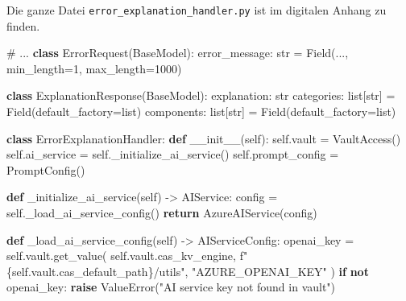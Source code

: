 \documentclass[
  a4paper,
  12pt,
  oneside,
  open=any,
  BCOR=12mm,
  DIV=14,
  parskip=half*,
  headsepline,
  footsepline,
  pointlessnumbers,
  liststotoc,
  numbers=noenddot,
  listof=totoc]{scrartcl}
\newenvironment{Shaded}{\begin{snugshade}}{\end{snugshade}}
\newcommand{\BuiltInTok}[1]{\textcolor[rgb]{0.00,0.23,0.31}{#1}}
\newcommand{\CommentTok}[1]{\textcolor[rgb]{0.37,0.37,0.37}{#1}}
\newcommand{\ControlFlowTok}[1]{\textcolor[rgb]{0.00,0.23,0.31}{\textbf{#1}}}
\newcommand{\DecValTok}[1]{\textcolor[rgb]{0.68,0.00,0.00}{#1}}
\newcommand{\FunctionTok}[1]{\textcolor[rgb]{0.28,0.35,0.67}{#1}}
\newcommand{\KeywordTok}[1]{\textcolor[rgb]{0.00,0.23,0.31}{\textbf{#1}}}
\newcommand{\NormalTok}[1]{\textcolor[rgb]{0.00,0.23,0.31}{#1}}
\newcommand{\OperatorTok}[1]{\textcolor[rgb]{0.37,0.37,0.37}{#1}}
\newcommand{\PreprocessorTok}[1]{\textcolor[rgb]{0.68,0.00,0.00}{#1}}
\newcommand{\SpecialCharTok}[1]{\textcolor[rgb]{0.37,0.37,0.37}{#1}}
\newcommand{\SpecialStringTok}[1]{\textcolor[rgb]{0.13,0.47,0.30}{#1}}
\newcommand{\StringTok}[1]{\textcolor[rgb]{0.13,0.47,0.30}{#1}}
\newcommand{\VariableTok}[1]{\textcolor[rgb]{0.07,0.07,0.07}{#1}}
\begin{document}
Die ganze Datei \texttt{error\_explanation\_handler.py} ist im digitalen
Anhang zu finden.

\begin{Shaded}
\begin{Highlighting}[]
\CommentTok{\# ...}
\KeywordTok{class}\NormalTok{ ErrorRequest(BaseModel):}
\NormalTok{    error\_message: }\BuiltInTok{str} \OperatorTok{=}\NormalTok{ Field(..., min\_length}\OperatorTok{=}\DecValTok{1}\NormalTok{, max\_length}\OperatorTok{=}\DecValTok{1000}\NormalTok{)}

\KeywordTok{class}\NormalTok{ ExplanationResponse(BaseModel):}
\NormalTok{    explanation: }\BuiltInTok{str}
\NormalTok{    categories: }\BuiltInTok{list}\NormalTok{[}\BuiltInTok{str}\NormalTok{] }\OperatorTok{=}\NormalTok{ Field(default\_factory}\OperatorTok{=}\BuiltInTok{list}\NormalTok{)}
\NormalTok{    components: }\BuiltInTok{list}\NormalTok{[}\BuiltInTok{str}\NormalTok{] }\OperatorTok{=}\NormalTok{ Field(default\_factory}\OperatorTok{=}\BuiltInTok{list}\NormalTok{)}

\KeywordTok{class}\NormalTok{ ErrorExplanationHandler:}
    \KeywordTok{def} \FunctionTok{\_\_init\_\_}\NormalTok{(}\VariableTok{self}\NormalTok{):}
        \VariableTok{self}\NormalTok{.vault }\OperatorTok{=}\NormalTok{ VaultAccess()}
        \VariableTok{self}\NormalTok{.ai\_service }\OperatorTok{=} \VariableTok{self}\NormalTok{.\_initialize\_ai\_service()}
        \VariableTok{self}\NormalTok{.prompt\_config }\OperatorTok{=}\NormalTok{ PromptConfig()}

    \KeywordTok{def}\NormalTok{ \_initialize\_ai\_service(}\VariableTok{self}\NormalTok{) }\OperatorTok{{-}\textgreater{}}\NormalTok{ AIService:}
\NormalTok{        config }\OperatorTok{=} \VariableTok{self}\NormalTok{.\_load\_ai\_service\_config()}
        \ControlFlowTok{return}\NormalTok{ AzureAIService(config)}

    \KeywordTok{def}\NormalTok{ \_load\_ai\_service\_config(}\VariableTok{self}\NormalTok{) }\OperatorTok{{-}\textgreater{}}\NormalTok{ AIServiceConfig:}
\NormalTok{        openai\_key }\OperatorTok{=} \VariableTok{self}\NormalTok{.vault.get\_value(}
            \VariableTok{self}\NormalTok{.vault.cas\_kv\_engine,}
            \SpecialStringTok{f"}\SpecialCharTok{\{}\VariableTok{self}\SpecialCharTok{.}\NormalTok{vault}\SpecialCharTok{.}\NormalTok{cas\_default\_path}\SpecialCharTok{\}}\SpecialStringTok{/utils"}\NormalTok{,}
            \StringTok{"AZURE\_OPENAI\_KEY"}
\NormalTok{        )}
        \ControlFlowTok{if} \KeywordTok{not}\NormalTok{ openai\_key:}
            \ControlFlowTok{raise} \PreprocessorTok{ValueError}\NormalTok{(}\StringTok{"AI service key not found in vault"}\NormalTok{)}


\end{Highlighting}
\end{Shaded}
\end{document}
